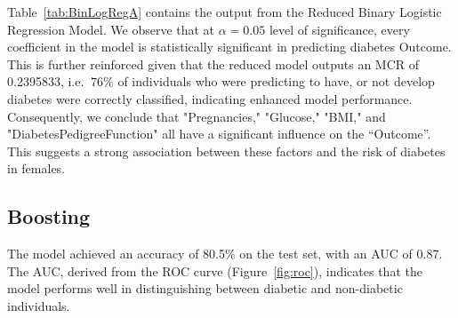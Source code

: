 \documentclass[12pt]{article}
\begin{document}
\begin{table}[h!]
	\centering
	\caption{Binary Logistic Regression Reduced Model Output}
	\label{tab:BinLogRegA}
\end{table}

Table~\ref{tab:BinLogRegA} contains the output from the Reduced Binary Logistic Regression Model. We observe that at $\alpha=0.05$ level of significance, every coefficient in the model is statistically significant in predicting diabetes Outcome. This is further reinforced given that the reduced model outputs an MCR of 0.2395833, i.e. $~76\%$ of individuals who were predicting to have, or not develop diabetes were correctly classified, indicating enhanced model performance. Consequently, we conclude that "Pregnancies," "Glucose," "BMI," and "DiabetesPedigreeFunction" all have a significant influence on the “Outcome”. This suggests a strong association between these factors and the risk of diabetes in females. \\


\subsection{Boosting}

The model achieved an accuracy of 80.5\% on the test set, with an AUC of 0.87. The AUC, derived from the ROC curve (Figure~\ref{fig:roc}), indicates that the model performs well in distinguishing between diabetic and non-diabetic individuals.

\end{document}
